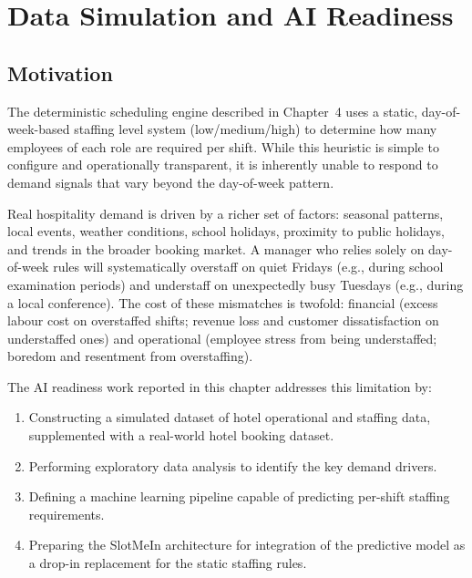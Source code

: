 
\chapter{Data Simulation and AI Readiness}
\label{ch:ai_readiness}

\section{Motivation}

The deterministic scheduling engine described in Chapter~4 uses a static, day-of-week-based staffing level system (low/medium/high) to determine how many employees of each role are required per shift. While this heuristic is simple to configure and operationally transparent, it is inherently unable to respond to demand signals that vary beyond the day-of-week pattern.

Real hospitality demand is driven by a richer set of factors: seasonal patterns, local events, weather conditions, school holidays, proximity to public holidays, and trends in the broader booking market. A manager who relies solely on day-of-week rules will systematically overstaff on quiet Fridays (e.g., during school examination periods) and understaff on unexpectedly busy Tuesdays (e.g., during a local conference). The cost of these mismatches is twofold: financial (excess labour cost on overstaffed shifts; revenue loss and customer dissatisfaction on understaffed ones) and operational (employee stress from being understaffed; boredom and resentment from overstaffing).

The AI readiness work reported in this chapter addresses this limitation by:
\begin{enumerate}
    \item Constructing a simulated dataset of hotel operational and staffing data, supplemented with a real-world hotel booking dataset.
    \item Performing exploratory data analysis to identify the key demand drivers.
    \item Defining a machine learning pipeline capable of predicting per-shift staffing requirements.
    \item Preparing the SlotMeIn architecture for integration of the predictive model as a drop-in replacement for the static staffing rules.
\end{enumerate}

